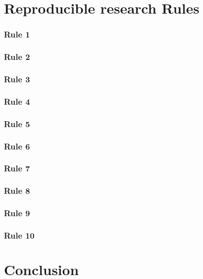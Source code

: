 \documentclass{beamer}
\begin{document}
\section{Reproducible research Rules}
\begin{frame}
\frametitle{Rule 1}


\end{frame}
\begin{frame}
\frametitle{Rule 2}


\end{frame}
\begin{frame}
\frametitle{Rule 3}


\end{frame}
\begin{frame}
\frametitle{Rule 4}


\end{frame}
\begin{frame}
\frametitle{Rule 5}


\end{frame}
\begin{frame}
\frametitle{Rule 6}


\end{frame}
\begin{frame}
\frametitle{Rule 7}


\end{frame}
\begin{frame}
\frametitle{Rule 8}


\end{frame}
\begin{frame}
\frametitle{Rule 9}


\end{frame}
\begin{frame}
\frametitle{Rule 10}


\end{frame}
\section{Conclusion}
\end{document}
